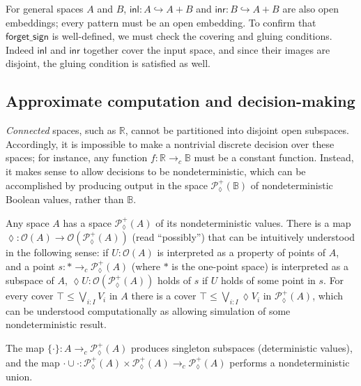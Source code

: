 \documentclass[conference]{IEEEtran}
\newcommand{\PLower}{\mathcal{P}_\lozenge}
\newcommand{\hookto}{\hookrightarrow}
\newcommand{\cto}{\to_c}
\newcommand{\R}{\mathbb{R}}
\newcommand{\One}{\ast}
\newcommand{\Open}[1]{\mathcal{O}({#1})}
\newcommand{\bool}{\mathbb{B}}
\begin{document}
For general spaces $A$ and $B$, $\mathsf{inl} : A \hookto A + B$ and $\mathsf{inr} : B \hookto A + B$ are also open embeddings; every pattern must be an open embedding. To confirm that $\mathsf{forget\_sign}$ is well-defined, we must check the covering and gluing conditions. Indeed $\mathsf{inl}$ and $\mathsf{inr}$ together cover the input space, and since their images are disjoint, the gluing condition is satisfied as well.

\subsection{Approximate computation and decision-making}
\label{s:ex:approx}

\emph{Connected} spaces, such as $\R$, cannot be partitioned into disjoint open subspaces. Accordingly, it is impossible to make a nontrivial discrete decision over these spaces; for instance, any function $f : \R \cto \bool$ must be a constant function. Instead, it makes sense to allow decisions to be nondeterministic, which can be accomplished by producing output in the space $\PLower^+(\bool)$ of nondeterministic Boolean values, rather than $\bool$.

Any space $A$ has a space $\PLower^+(A)$ of its nondeterministic values. There is a map $\lozenge : \Open{A} \to \Open{\PLower^+(A)}$ (read ``possibly'') that can be intuitively understood in the following sense: if $U : \Open{A}$ is interpreted as a property of points of $A$, and a point $s : \One \cto \PLower^+(A)$ (where $\One$ is the one-point space) is interpreted as a subspace of $A$, $\lozenge U : \Open{\PLower^+(A)}$ holds of $s$ if $U$ holds of some point in $s$. For every cover $\top \le \bigvee_{i : I} V_i$ in $A$ there is a cover $\top \le \bigvee_{i : I} \lozenge V_i$ in $\PLower^+(A)$, which can be understood computationally as allowing simulation of some nondeterministic result.

The map $\{ \cdot \} : A \cto \PLower^+(A)$ produces singleton subspaces (deterministic values), and the map $\cdot \cup \cdot : \PLower^+(A) \times \PLower^+(A) \cto \PLower^+(A)$ performs a nondeterministic union.
\end{document}
